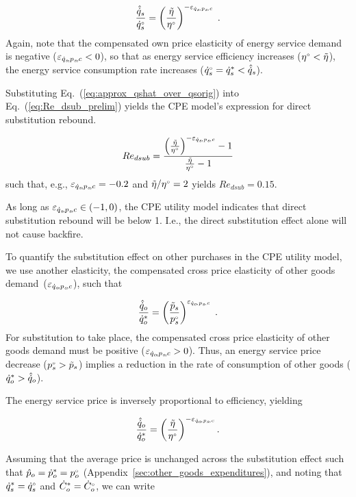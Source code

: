 \begin{equation} \label{eq:approx_qshat_over_qsorig}
  \frac{\hat{\dot{q}}_s}{{}{\dot{q}}^{\scriptscriptstyle \circ}_s} = \left( \frac{\tilde{\eta}}{{}{\eta}^{\scriptscriptstyle \circ}} \right)^{-\varepsilon_{\dot{q}_s\!,p_s\!,c}} \; .
\end{equation}
%
Again, note that the compensated own price elasticity of energy service demand
is negative ($\varepsilon_{\dot{q}_s\!,p_s\!,c} < 0$), so that
as energy service efficiency increases 
(${}{\eta}^{\scriptscriptstyle \circ} < \tilde{\eta}$),
the energy service consumption rate increases 
(${}{\dot{q}}^{\scriptscriptstyle \circ}_s = {\dot{q}}^*_s < \hat{\dot{q}}_s$).

Substituting Eq.~(\ref{eq:approx_qshat_over_qsorig}) into Eq.~(\ref{eq:Re_dsub_prelim})
yields the CPE model's expression for direct substitution rebound.

\begin{equation} \label{eq:Re_dsub_approx}
  Re_{dsub} = \frac{\left( \frac{\tilde{\eta}}{{}{\eta}^{\scriptscriptstyle \circ}} \right)^{-\varepsilon_{\dot{q}_s\!,p_s\!,c}} - 1} {\frac{\tilde{\eta}}{{}{\eta}^{\scriptscriptstyle \circ}} - 1}
\end{equation}
%
such that, e.g.,
$\varepsilon_{\dot{q}_s\!,p_s\!,c} = -0.2$ and $\tilde{\eta}/{}{\eta}^{\scriptscriptstyle \circ} = 2$
yields $Re_{dsub} = 0.15$.

As long as $\varepsilon_{\dot{q}_s\!,p_s\!,c} \in (-1, 0)$,
the CPE utility model indicates that
direct substitution rebound will be below 1.
I.e., the direct substitution effect alone
will not cause backfire. 

To quantify the substitution effect on other purchases in the CPE utility model,
we use another elasticity,
the compensated cross price elasticity of other goods demand~($\varepsilon_{\dot{q}_o\!,p_s\!,c}$), 
such that

\begin{equation}
  \frac{\hat{\dot{q}}_o}{{\dot{q}}^*_o} = \left( \frac{\tilde{p}_s}{{}{p}^{\scriptscriptstyle \circ}_s} \right) ^ {\varepsilon_{\dot{q}_o\!,p_s\!,c}} \; .
\end{equation}
%
For substitution to take place, the compensated cross price elasticity
of other goods demand must be positive ($\varepsilon_{\dot{q}_o\!,p_s\!,c} > 0$). Thus,
an energy service price decrease 
(${}{p}^{\scriptscriptstyle \circ}_s > \tilde{p}_s$)
implies a reduction in the rate of consumption of other goods
(${\dot{q}}^*_o > \hat{\dot{q}}_o$).

The energy service price is inversely proportional to 
efficiency, yielding

\begin{equation} \label{eq:qohat_qostar}
  \frac{\hat{\dot{q}}_o}{{\dot{q}}^*_o} = \left( \frac{\tilde{\eta}}{{}{\eta}^{\scriptscriptstyle \circ}} \right) ^ {-\varepsilon_{\dot{q}_o\!,p_s\!,c}} .
\end{equation}

Assuming that the average price is unchanged across the substitution effect
such that $\hat{p}_o = {\dot{p}}^*_o = {}{p}^{\scriptscriptstyle \circ}_o$
(Appendix~\ref{sec:other_goods_expenditures}),
and noting that ${\dot{q}}^*_s = {}{\dot{q}}^{\scriptscriptstyle \circ}_s$ and ${\dot{C}}^*_o = {}{\dot{C}}^{\scriptscriptstyle \circ}_o$,
we can write


